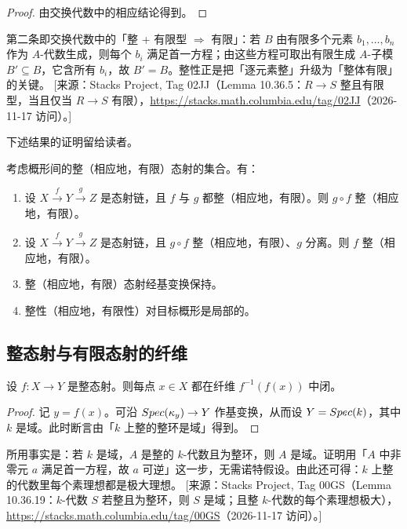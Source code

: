 \begin{proof}
由交换代数中的相应结论得到。
\end{proof}

\begin{yizhu}
第二条即交换代数中的「整 + 有限型 $\Rightarrow$ 有限」：若 $B$ 由有限多个元素 $b_1,\ldots,b_n$ 作为 $A$-代数生成，则每个 $b_i$ 满足首一方程；由这些方程可取出有限生成 $A$-子模 $B'\subseteq B$，它含所有 $b_i$，故 $B'=B$。整性正是把「逐元素整」升级为「整体有限」的关键。
[来源：Stacks Project, Tag 02JJ（Lemma 10.36.5：$R\to S$ 整且有限型，当且仅当 $R\to S$ 有限），\url{https://stacks.math.columbia.edu/tag/02JJ}（2026-11-17 访问）。]
\end{yizhu}

下述结果的证明留给读者。

\begin{lemma}\label{lem:30.1.6}
考虑概形间的整（相应地，有限）态射的集合。有：
\begin{enumerate}[label=(\roman*),leftmargin=2.6em,itemsep=0.3ex]
  \item 设 $X\xrightarrow{f}Y\xrightarrow{g}Z$ 是态射链，且 $f$ 与 $g$ 都整（相应地，有限）。则 $g\circ f$ 整（相应地，有限）。
  \item 设 $X\xrightarrow{f}Y\xrightarrow{g}Z$ 是态射链，且 $g\circ f$ 整（相应地，有限）、$g$ 分离。则 $f$ 整（相应地，有限）。
  \item 整（相应地，有限）态射经基变换保持。
  \item 整性（相应地，有限性）对目标概形是局部的。
\end{enumerate}
\end{lemma}

\subsection{整态射与有限态射的纤维}\label{sec:30.2}

\begin{lemma}\label{lem:30.2.1}
设 $f\colon X\to Y$ 是整态射。则每点 $x\in X$ 都在纤维 $f^{-1}(f(x))$ 中闭。
\end{lemma}

\begin{proof}
记 $y=f(x)$。可沿 $Spec(\kappa_y)\to Y$ 作基变换，从而设 $Y=Spec(k)$，其中 $k$ 是域。此时断言由「$k$ 上整的整环是域」得到。
\end{proof}

\begin{yizhu}
所用事实是：若 $k$ 是域，$A$ 是整的 $k$-代数且为整环，则 $A$ 是域。证明用「$A$ 中非零元 $a$ 满足首一方程，故 $a$ 可逆」这一步，无需诺特假设。由此还可得：$k$ 上整的代数里每个素理想都是极大理想。
[来源：Stacks Project, Tag 00GS（Lemma 10.36.19：$k$-代数 $S$ 若整且为整环，则 $S$ 是域；且整 $k$-代数的每个素理想极大），\url{https://stacks.math.columbia.edu/tag/00GS}（2026-11-17 访问）。]
\end{yizhu}


